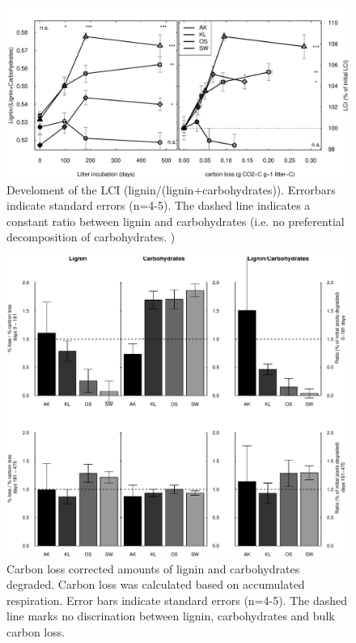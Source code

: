 \documentclass[10pt]{article}
\begin{document}
\newpage
\begin{figure}[h!]
\vspace*{2mm}
\begin{center}
\includegraphics{plosone-lci}
\end{center}
\caption{Develoment of the LCI (lignin/(lignin+carbohydrates)). Errorbars indicate standard errors (n=4-5). The dashed line indicates a constant ratio between lignin and carbohydrates (i.e. no preferential decomposition of carbohydrates. )}
\label{fig:lci}
\end{figure}

\newpage
\begin{figure}[h!]
\vspace*{2mm}
\begin{center}
\includegraphics{plosone-degrdiff}
\end{center}
\caption{Carbon loss corrected amounts of lignin and carbohydrates degraded. Carbon loss was calculated based on accumulated respiration. Error bars indicate standard errors (n=4-5). The dashed line marks no discrination between lignin, carbohydrates and bulk carbon loss.}
\label{fig:degr}
\end{figure}
\end{document}
